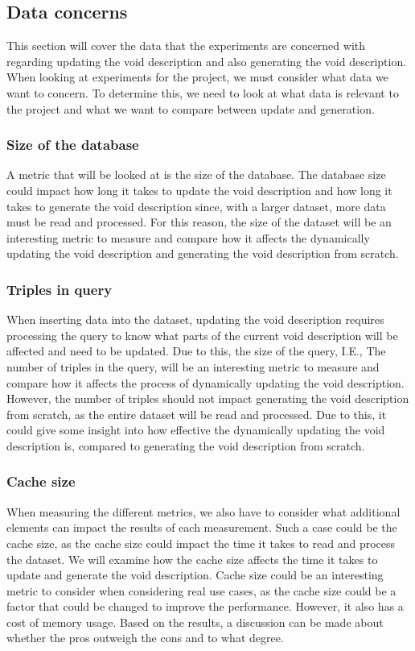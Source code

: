 \subsection{Data concerns}\label{sec:concerns}
This section will cover the data that the experiments are concerned with regarding updating the void description and also generating the void description. When looking at experiments for the project, we must consider what data we want to concern. To determine this, we need to look at what data is relevant to the project and what we want to compare between update and generation.

\subsubsection{Size of the database}
A metric that will be looked at is the size of the database. The database size could impact how long it takes to update the void description and how long it takes to generate the void description since, with a larger dataset, more data must be read and processed. For this reason, the size of the dataset will be an interesting metric to measure and compare how it affects the dynamically updating the \gls{void} description and generating the void description from scratch.

\subsubsection{Triples in query}
When inserting data into the dataset, updating the \gls{void} description requires processing the query to know what parts of the current \gls{void} description will be affected and need to be updated. Due to this, the size of the query, I.E., The number of triples in the query, will be an interesting metric to measure and compare how it affects the process of dynamically updating the \gls{void} description. However, the number of triples should not impact generating the \gls{void} description from scratch, as the entire dataset will be read and processed. Due to this, it could give some insight into how effective the dynamically updating the \gls{void} description is, compared to generating the \gls{void} description from scratch.


\subsubsection{Cache size}
When measuring the different metrics, we also have to consider what additional elements can impact the results of each measurement. Such a case could be the cache size, as the cache size could impact the time it takes to read and process the dataset. We will examine how the cache size affects the time it takes to update and generate the \gls{void} description. Cache size could be an interesting metric to consider when considering real use cases, as the cache size could be a factor that could be changed to improve the performance. However, it also has a cost of memory usage. Based on the results, a discussion can be made about whether the pros outweigh the cons and to what degree.



